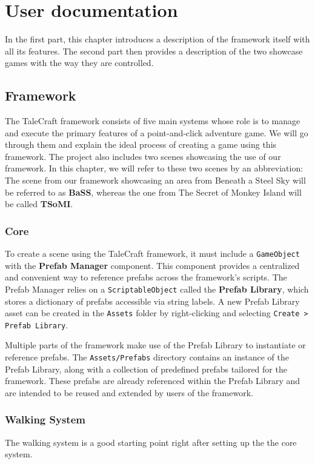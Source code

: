 \chapter{User documentation}
In the first part, this chapter introduces a description of the framework itself with all its features. The second part then provides a description of the two showcase games with the way they are controlled.  

\section{Framework}
The TaleCraft framework consists of five main systems whose role is to manage and execute the primary features of a point-and-click adventure game. We will go through them and explain the ideal process of creating a game using this framework. The project also includes two scenes showcasing the use of our framework. In this chapter, we will refer to these two scenes by an abbreviation: The scene from our framework showcasing an area from Beneath a Steel Sky will be referred to as \textbf{BaSS}, whereas the one from The Secret of Monkey Island will be called \textbf{TSoMI}.

\subsection{Core}
To create a scene using the TaleCraft framework, it must include a \verb|GameObject| with the \textbf{Prefab Manager} component. This component provides a centralized and convenient way to reference prefabs across the framework's scripts. The Prefab Manager relies on a \verb|ScriptableObject| called the \textbf{Prefab Library}, which stores a dictionary of prefabs accessible via string labels. A new Prefab Library asset can be created in the \verb|Assets| folder by right-clicking and selecting \verb|Create > Prefab Library|.

Multiple parts of the framework make use of the Prefab Library to instantiate or reference prefabs. The \verb|Assets/Prefabs| directory contains an instance of the Prefab Library, along with a collection of predefined prefabs tailored for the framework. These prefabs are already referenced within the Prefab Library and are intended to be reused and extended by users of the framework.

\subsection{Walking System}
The walking system is a good starting point right after setting up the the core system. 

